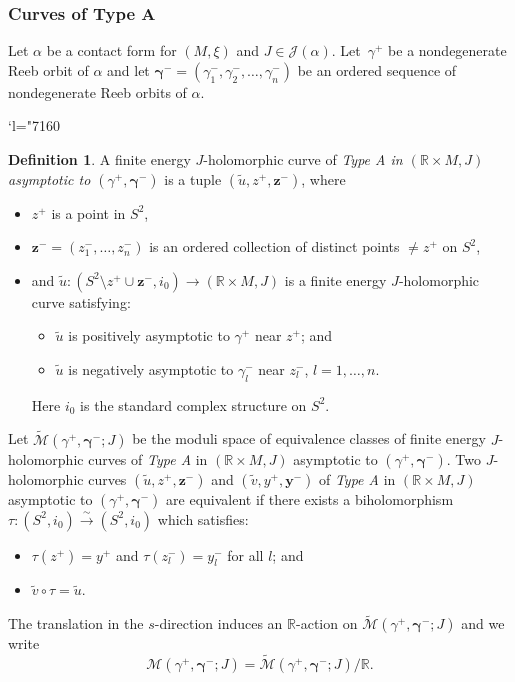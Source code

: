 \documentclass[10pt]{amsart}
\let\mathcal\mathscr
\newcommand{\isom}{\stackrel\sim\longrightarrow}
\newcommand{\bmy}{\boldsymbol{y}}
\newcommand{\bmz}{\boldsymbol{z}}
\newcommand{\Changel}{\mathcode`l="7160}
\theoremstyle{plain}
\theoremstyle{definition}
\newtheorem{defn}[thm]{Definition}
\numberwithin{equation}{subsection}
\newcommand{\RR}{\mathbb{R}}
\let\bs\boldsymbol
\begin{document}
\subsubsection{Curves of Type A} \label{subsubsection: A}

Let $\alpha$ be a contact form for $(M,\xi)$ and $J\in \mathcal{J}(\alpha)$. Let~$\gamma^+$ be a nondegenerate Reeb orbit of $\alpha$ and let $\bs\gamma^-=(\gamma^-_1,\gamma^-_2,\dots,\gamma^-_n)$ be an ordered sequence of nondegenerate Reeb orbits of $\alpha$.

\bgroup
\Changel
\begin{defn}
A finite energy $J$-holomorphic curve of \emph{Type A in $(\mathbb{R}\times M,J)$ asymptotic to $(\gamma^+,\bs\gamma^-)$} is a tuple $(\widetilde{u},z^+,\bmz^-)$, where
\begin{itemize}
\item
$z^+$ is a point in $S^2$,
\item
$\bmz^-=(z^-_1,\dots,z^-_n)$ is an ordered collection of distinct points $\not=z^+$ on $S^2$,
\item
and $\widetilde{u}: (S^2\setminus z^+ \cup \bmz^-,i_0) \to (\mathbb{R}\times M,J)$ is a finite energy $J$-holomorphic curve satisfying:
\begin{itemize}
\item $\widetilde{u}$ is positively asymptotic to $\gamma^+$ near $z^+$; and
\item $\widetilde{u}$ is negatively asymptotic to $\gamma^-_l$ near $z^-_l$, $l=1,\dots, n$.
\end{itemize}
Here $i_0$ is the standard complex structure on $S^2$.
\end{itemize}
\end{defn}

Let $\widetilde{\mathcal{M}}(\gamma^+,\bs\gamma^-;J)$ be the moduli space of equivalence classes of finite energy $J$-holomorphic curves of \emph{Type A} in $(\mathbb{R}\times M,J)$ asymptotic to $(\gamma^+,\bs\gamma^-)$. Two $J$\nobreakdash-holomorphic curves $(\widetilde{u},z^+,\bmz^-)$ and $(\widetilde{v},y^+,\bmy^-)$ of \emph{Type A} in $(\mathbb{R}\times M,J)$ asymptotic to $(\gamma^+,\bs\gamma^-)$ are equivalent if there exists a biholomorphism $\tau:(S^2,i_0)\isom (S^2,i_0)$ which satisfies:
\begin{itemize}
\item $\tau(z^+)=y^+ $ and $\tau(z^-_l)= y^-_l $ for all $l$; and
\item $\widetilde{v} \circ \tau = \widetilde{u}$.
\end{itemize}
The translation in the $s$-direction induces an $\mathbb{R}$-action on $\widetilde{\mathcal{M}}(\gamma^+,\bs\gamma^-;J)$ and we write
$${\mathcal{M}}(\gamma^+,\bs\gamma^-;J)=\widetilde{\mathcal{M}}(\gamma^+,\bs\gamma^-;J)/\RR.$$
\end{document}
